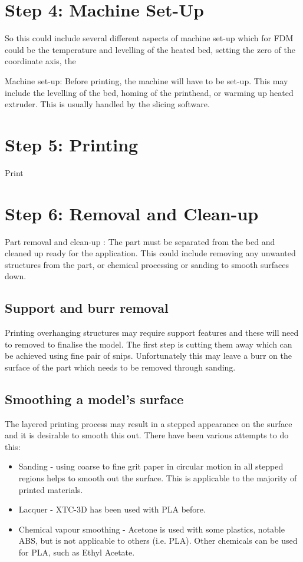 \newpage
\section{Step 4: Machine Set-Up}

So this could include several different aspects of machine set-up which for FDM could be the temperature and levelling of the heated bed, setting the zero of the coordinate axis, the 

Machine set-up: Before printing, the machine will have to be set-up. This may include the levelling of the bed, homing of the printhead, or warming up heated extruder. This is usually handled by the slicing software. 

\newpage
\section{Step 5: Printing }

Print 

\newpage
\section{Step 6: Removal and Clean-up}

Part removal and clean-up : The part must be separated from the bed and cleaned up ready for the application. This could include removing any unwanted structures from the part, or chemical processing or sanding to smooth surfaces down. 

\subsection{Support and burr removal}

Printing overhanging structures may require support features and these will need to removed to finalise the model. The first step is cutting them away which can be achieved using fine pair of snips. Unfortunately this may leave a burr on the surface of the part which needs to be removed through sanding. 

\subsection{Smoothing a model's surface}

The layered printing process may result in a stepped appearance on the surface and it is desirable to smooth this out. There have been various attempts to do this: 
\begin{itemize}
 \item Sanding - using coarse to fine grit paper in circular motion in all stepped regions helps to smooth out the surface. This is applicable to the majority of printed materials. 
 \item Lacquer - XTC-3D has been used with PLA before. 
 \item Chemical vapour smoothing - Acetone is used with some plastics, notable ABS, but is not applicable to others (i.e. PLA). Other chemicals can be used for PLA, such as Ethyl Acetate. 
\end{itemize}

